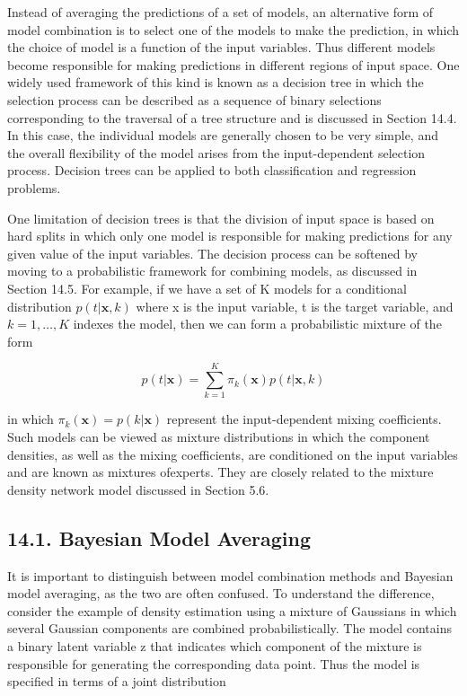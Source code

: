 \documentclass[
  10
]{article}
\begin{document}
Instead of averaging the predictions of a set of models, an alternative
form of model combination is to select one of the models to make the
prediction, in which the choice of model is a function of the input
variables. Thus different models become responsible for making
predictions in different regions of input space. One widely used
framework of this kind is known as a decision tree in which the
selection process can be described as a sequence of binary selections
corresponding to the traversal of a tree structure and is discussed in
Section 14.4. In this case, the individual models are generally chosen
to be very simple, and the overall flexibility of the model arises from
the input-dependent selection process. Decision trees can be applied to
both classification and regression problems.

One limitation of decision trees is that the division of input space is
based on hard splits in which only one model is responsible for making
predictions for any given value of the input variables. The decision
process can be softened by moving to a probabilistic framework for
combining models, as discussed in Section 14.5. For example, if we have
a set of K models for a conditional distribution
\(p ( t | \mathbf { x } , k )\) where x is the input variable, t is the
target variable, and \(k = 1 , \ldots , K\) indexes the model, then we
can form a probabilistic mixture of the form

\[
p (t | \mathbf {x}) = \sum_ {k = 1} ^ {K} \pi_ {k} (\mathbf {x}) p (t | \mathbf {x}, k)\tag{14.1}
\]

in which \(\pi _ { k } ( \mathbf { x } ) = p ( k | \mathbf { x } )\)
represent the input-dependent mixing coefficients. Such models can be
viewed as mixture distributions in which the component densities, as
well as the mixing coefficients, are conditioned on the input variables
and are known as mixtures ofexperts. They are closely related to the
mixture density network model discussed in Section 5.6.

\subsection{14.1. Bayesian Model
Averaging}\label{bayesian-model-averaging}

It is important to distinguish between model combination methods and
Bayesian model averaging, as the two are often confused. To understand
the difference, consider the example of density estimation using a
mixture of Gaussians in which several Gaussian components are combined
probabilistically. The model contains a binary latent variable z that
indicates which component of the mixture is responsible for generating
the corresponding data point. Thus the model is specified in terms of a
joint distribution
\end{document}
